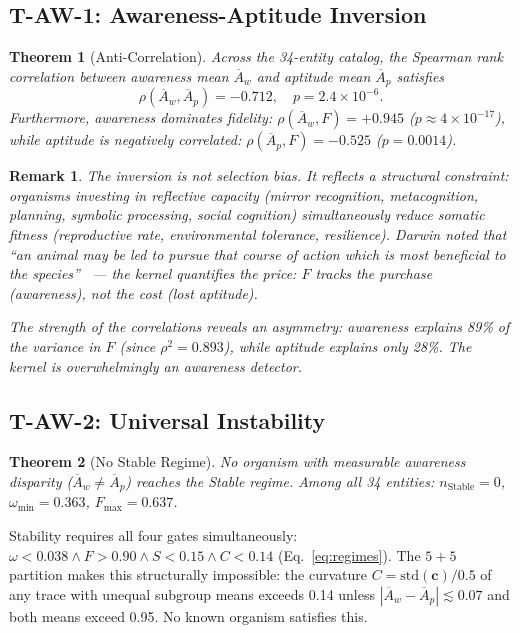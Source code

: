 \documentclass[
  aps,
  prd,
  twocolumn,
  superscriptaddress,
  nofootinbib,
  floatfix
]{revtex4-2}
\newtheorem{theorem}{Theorem}
\newtheorem{remark}{Remark}
\newcommand{\beq}{\begin{equation}}
\newcommand{\eeq}{\end{equation}}
\newcommand{\tvec}{\mathbf{c}}
\newcommand{\Aw}{\overline{A}_{\!w}}
\newcommand{\Ap}{\overline{A}_{\!p}}
\begin{document}
\subsection{T-AW-1: Awareness-Aptitude Inversion}

\begin{theorem}[Anti-Correlation]\label{thm:TAW1}
Across the 34-entity catalog, the Spearman rank correlation
between awareness mean $\Aw$ and aptitude mean $\Ap$ satisfies
\beq\label{eq:inversion}
  \rho(\Aw, \Ap) = -0.712, \quad p = 2.4 \times 10^{-6}.
\eeq
Furthermore, awareness dominates fidelity:
$\rho(\Aw, F) = +0.945$ ($p \approx 4 \times 10^{-17}$),
while aptitude is negatively correlated:
$\rho(\Ap, F) = -0.525$ ($p = 0.0014$).
\end{theorem}

\begin{remark}
The inversion is not selection bias.  It reflects a
structural constraint: organisms investing in reflective
capacity (mirror recognition, metacognition, planning,
symbolic processing, social cognition) simultaneously
reduce somatic fitness (reproductive rate, environmental
tolerance, resilience).  Darwin noted that ``an animal
may be led to pursue that course of action which is most
beneficial to the
species''~\cite{darwin1859origin} --- the kernel quantifies
the price: $F$ tracks the purchase (awareness), not the
cost (lost aptitude).

The strength of the correlations reveals an asymmetry:
awareness explains 89\% of the variance in $F$ (since
$\rho^2 = 0.893$), while aptitude explains only
28\%.  The kernel is overwhelmingly an awareness detector.
\end{remark}

\subsection{T-AW-2: Universal Instability}

\begin{theorem}[No Stable Regime]\label{thm:TAW2}
No organism with measurable awareness disparity
($\Aw \neq \Ap$) reaches the Stable regime.  Among all 34
entities: $n_{\mathrm{Stable}} = 0$, $\omega_{\min} = 0.363$,
$F_{\max} = 0.637$.
\end{theorem}

Stability requires all four gates simultaneously:
$\omega < 0.038 \wedge F > 0.90 \wedge S < 0.15 \wedge
C < 0.14$ (Eq.~\ref{eq:regimes}).  The $5\!+\!5$ partition
makes this structurally impossible: the curvature $C =
\mathrm{std}(\tvec)/0.5$ of any trace with unequal subgroup
means exceeds 0.14 unless $|\Aw - \Ap| \lesssim 0.07$ and
both means exceed 0.95.  No known organism satisfies this.
\end{document}
